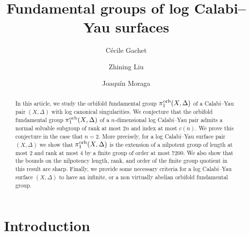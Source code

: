 \documentclass{amsart}
\theoremstyle{definition}
\theoremstyle{remark}
\numberwithin{equation}{section}
\begin{document}
\title[Fundamental groups of log Calabi--Yau surfaces]{Fundamental groups of log Calabi--Yau surfaces}

\author[C. Gachet]{C\'ecile Gachet}
\address{Ruhr Universit\"at Bochum, Universit\"atsstr. 150, 
44801 Bochum, Germany
}

\author[Z.~Liu]{Zhining Liu}
\address{Laboratoire de Mathématiques et Applications,
Université de Poitiers,
86073 Poitiers CEDEX 9,
France}

\author[J.~Moraga]{Joaqu\'in Moraga}
\address{UCLA Mathematics Department, Box 951555, Los Angeles, CA 90095-1555, USA
}


\begin{abstract}
In this article, 
we study the orbifold fundamental group
$\pi_1^{\rm orb}(X,\Delta)$
of a Calabi--Yau pair $(X,\Delta)$ with log canonical singularities.
We conjecture that the orbifold fundamental group
$\pi_1^{\rm orb}(X,\Delta)$ of a $n$-dimensional log Calabi--Yau pair
admits a normal solvable subgroup
of rank at most $2n$
and index at most $c(n)$.
We prove this conjecture in the case that $n=2$. 
More precisely, for a log Calabi--Yau surface pair $(X,\Delta)$ we show that $\pi_1^{\rm orb}(X,\Delta)$ is the extension of a nilpotent group of length at most $2$ and rank at most $4$ by a finite group of order at most $7200$. We also show that the bounds on the nilpotency length, rank, and order of the finite group quotient in this result are sharp.
Finally, we provide some necessary criteria for a log Calabi--Yau surface $(X,\Delta)$ to have an infinite, or a non virtually abelian orbifold fundamental group.
\end{abstract}


\maketitle

\setcounter{tocdepth}{1}
\tableofcontents

\section{Introduction}
\end{document}
